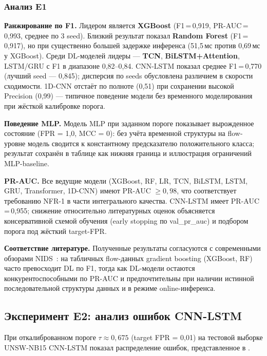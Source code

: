 \subsubsection{Анализ E1}

\textbf{Ранжирование по F1.} Лидером является \textbf{XGBoost}
(F1\,=\,0{,}919, PR-AUC\,=\,0{,}993, среднее по 3 seed). Близкий
результат показал \textbf{Random Forest} (F1\,=\,0{,}917), но при
существенно большей задержке инференса (51{,}5\,мс против 0{,}69\,мс
у XGBoost). Среди DL-моделей лидеры --- \textbf{TCN},
\textbf{BiLSTM+Attention}, LSTM/GRU с F1 в диапазоне 0{,}82--0{,}84.
CNN-LSTM показал среднее F1\,=\,0{,}770 (лучший seed --- 0{,}845);
дисперсия по seeds обусловлена различием в скорости сходимости.
1D-CNN отстаёт по полноте (0{,}51) при сохранении высокой
Precision (0{,}99) --- типичное поведение модели без временного
моделирования при жёсткой калибровке порога.

\textbf{Поведение MLP.} Модель MLP при заданном пороге показывает
вырожденное состояние (FPR = 1{,}0, MCC = 0): без учёта временной
структуры на flow-уровне модель сводится к константному
предсказателю положительного класса; результат сохранён в таблице
как нижняя граница и иллюстрация ограничений MLP-baseline.

\textbf{PR-AUC.} Все ведущие модели (XGBoost, RF, LR, TCN, BiLSTM,
LSTM, GRU, Transformer, 1D-CNN) имеют PR-AUC \(\geq 0{,}98\), что
соответствует требованию NFR-1 в части интегрального качества.
CNN-LSTM имеет PR-AUC\,=\,0{,}955; снижение относительно
литературных оценок объясняется консервативной схемой обучения
(early stopping по val\_pr\_auc) и подбором порога под жёсткий
target-FPR.

\textbf{Соответствие литературе.} Полученные результаты согласуются с
современными обзорами NIDS~\cite{ferrag2020dlcyber, ahmad2021nids}:
на табличных flow-данных gradient boosting (XGBoost, RF) часто
превосходит DL по F1, тогда как DL-модели остаются конкурентоспособными
по PR-AUC и предпочтительны при наличии истинной последовательной
структуры данных и в режиме online-инференса.

\subsection{Эксперимент E2: анализ ошибок CNN-LSTM}
\label{subsec:E2}

При откалиброванном пороге \(\tau \approx 0{,}675\) (target
FPR = 0{,}01) на тестовой выборке UNSW-NB15 CNN-LSTM показал
распределение ошибок, представленное в .

